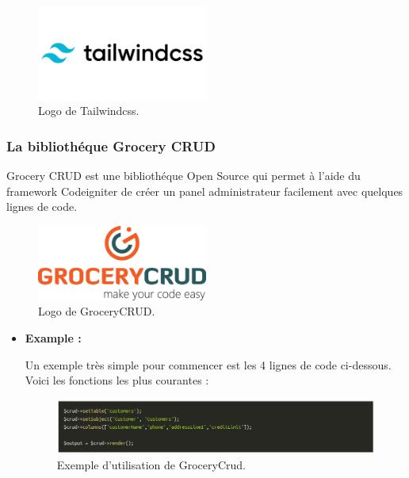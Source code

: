 \documentclass[french]{report}
\begin{document}
        \begin{figure}[H]
            \centering
            \includegraphics[width=0.5\textwidth]{images/tailwind-css-logo-vector.png}
            \caption{Logo de Tailwindcss.}
            \label{fig:my_label}
        \end{figure}
        
        \subsubsection{La bibliothéque Grocery CRUD}
        
        Grocery CRUD est une bibliothéque Open Source qui permet à l'aide du framework 
	Codeigniter de créer un panel administrateur facilement avec quelques lignes de code.
        
        \begin{figure}[H]
            \centering
            \includegraphics[width=0.5\textwidth]{images/logo-big.png}
            \caption{Logo de GroceryCRUD.}
        \end{figure}
        
        \begin{itemize}
            \item \textbf{Example :}
            
            Un exemple très simple pour commencer est les 4 lignes de code ci-dessous.
	    Voici les fonctions les plus courantes :
            \begin{figure}[H]
            \centering
            \includegraphics[width=1\textwidth]{images/example.png}
            \caption{Exemple d'utilisation de GroceryCrud.}
            \label{use of grocerycrud}
        \end{figure}
        \end{itemize}
        
\end{document}
